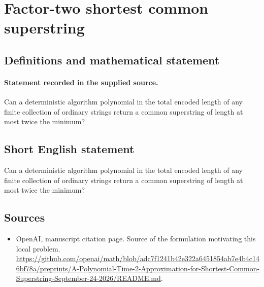 \documentclass[11pt]{article}
\begin{document}
\section*{Factor-two shortest common superstring}\label{30007484}
\subsection{Definitions and mathematical statement}
\paragraph{Statement recorded in the supplied source.}
Can a deterministic algorithm polynomial in the total encoded length of any finite collection of ordinary strings return a common superstring of length at most twice the minimum?
\subsection{Short English statement}
Can a deterministic algorithm polynomial in the total encoded length of any finite collection of ordinary strings return a common superstring of length at most twice the minimum?
\subsection{Sources}
\begin{itemize}
\item[S1] OpenAI, manuscript citation page. Source of the formulation motivating this local problem.
\url{https://github.com/openai/math/blob/adc7f1241b42e322a6451854ab7e4b4c146bf78a/preprints/A-Polynomial-Time-2-Approximation-for-Shortest-Common-Superstring-September-24-2026/README.md}.
\end{itemize}
\end{document}

